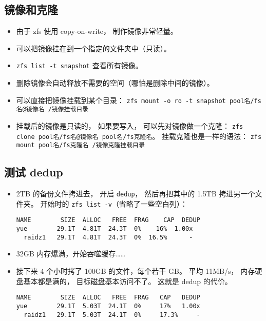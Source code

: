 \subsection{镜像和克隆}
\begin{itemize}
\item 由于 zfs 使用 copy-on-write， 制作镜像非常轻量。
\item 可以把镜像挂在到一个指定的文件夹中（只读）。
\item \verb|zfs list -t snapshot| 查看所有镜像。
\item 删除镜像会自动释放不需要的空间（哪怕是删除中间的镜像）。
\item 可以直接把镜像挂载到某个目录： \verb|zfs mount -o ro -t snapshot pool名/fs名@镜像名 /镜像挂载目录|
\item 挂载后的镜像是只读的， 如果要写入， 可以先对镜像做一个克隆： \verb|zfs clone pool名/fs名@镜像名 pool名/fs克隆名|。 挂载克隆也是一样的语法： \verb|zfs mount pool名/fs克隆名 /镜像克隆挂载目录|
\end{itemize}

\subsection{测试 dedup}
\begin{itemize}
\item 2TB 的备份文件拷进去， 开启 \verb|dedup|， 然后再把其中的 1.5TB 拷进另一个文件夹。 开始时的 \verb|zfs list -v|（省略了一些空白列）：
\begin{lstlisting}[language=none]
NAME        SIZE  ALLOC   FREE  FRAG    CAP  DEDUP
yue        29.1T  4.81T  24.3T  0%    16%  1.00x
  raidz1   29.1T  4.81T  24.3T  0%  16.5%      -
\end{lstlisting}
\item 32GB 内存爆满，开始吞噬缓存……
\item 接下来 4 个小时拷了 100GB 的文件，每个若干 GB。 平均 11MB/s， 内存硬盘基本都是满的， 目标磁盘基本访问不了。 这就是 dedup 的代价。
\begin{lstlisting}[language=none]
NAME        SIZE  ALLOC   FREE  FRAG   CAP   DEDUP
yue        29.1T  5.03T  24.1T  0%     17%   1.00x
  raidz1   29.1T  5.03T  24.1T  0%     17.3%     -
\end{lstlisting}

\end{itemize}
